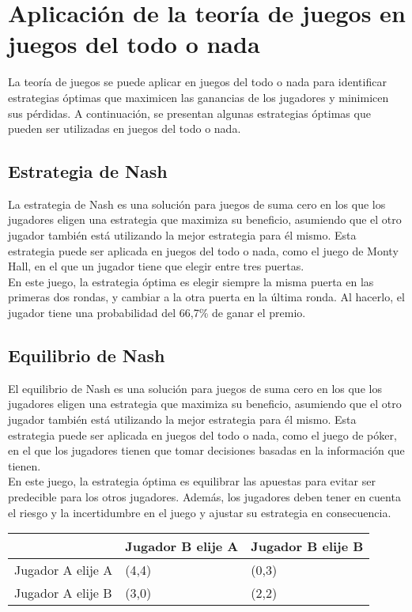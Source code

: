 \section{Aplicación de la teoría de juegos en juegos del todo o nada}

La teoría de juegos se puede aplicar en juegos del todo o nada para identificar estrategias 
óptimas que maximicen las ganancias de los jugadores y minimicen sus pérdidas. A continuación, 
se presentan algunas estrategias óptimas que pueden ser utilizadas en juegos del todo o nada.\\

\subsection{Estrategia de Nash}
La estrategia de Nash es una solución para juegos de suma cero en los que los jugadores eligen 
una estrategia que maximiza su beneficio, asumiendo que el otro jugador también está utilizando la 
mejor estrategia para él mismo. Esta estrategia puede ser aplicada en juegos del todo o nada,
como el juego de Monty Hall, en el que un jugador tiene que elegir entre tres puertas.\\

En este juego, la estrategia óptima es elegir siempre la misma puerta en las primeras dos rondas, y 
cambiar a la otra puerta en la última ronda. Al hacerlo, el jugador tiene una probabilidad del 66,7\% 
de ganar el premio.

\subsection{Equilibrio de Nash}
El equilibrio de Nash es una solución para juegos de suma cero en los que los jugadores eligen una 
estrategia que maximiza su beneficio, asumiendo que el otro jugador también está utilizando la mejor 
estrategia para él mismo. Esta estrategia puede ser aplicada en juegos del todo o nada, 
como el juego de póker, en el que los jugadores tienen que tomar decisiones basadas en la 
información que tienen.\\

En este juego, la estrategia óptima es equilibrar las apuestas para evitar ser predecible para los 
otros jugadores. Además, los jugadores deben tener en cuenta el riesgo y la incertidumbre en el juego 
y ajustar su estrategia en consecuencia.


\begin{tabular}{l|l|l|}
\cline{2-3}
                                        & Jugador B elije A & Jugador B elije B \\ \hline
\multicolumn{1}{|l|}{Jugador A elije A} & (4,4)             & (0,3)             \\ \hline
\multicolumn{1}{|l|}{Jugador A elije B} & (3,0)             & (2,2)             \\ \hline
\end{tabular}

